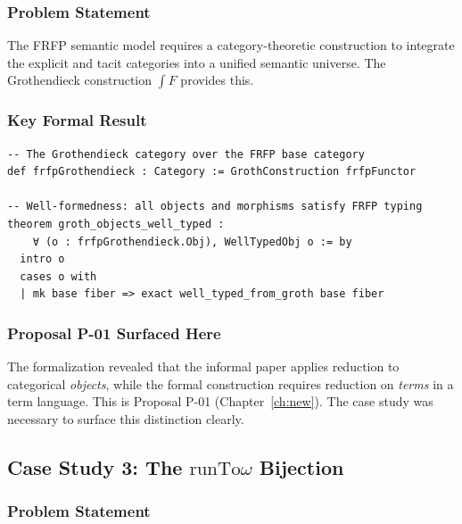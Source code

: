 
\subsubsection*{Problem Statement}

The FRFP semantic model requires a category-theoretic construction to integrate
the explicit and tacit categories into a unified semantic universe. The
Grothendieck construction $\int F$ provides this.

\subsubsection*{Key Formal Result}

\begin{lstlisting}
-- The Grothendieck category over the FRFP base category
def frfpGrothendieck : Category := GrothConstruction frfpFunctor

-- Well-formedness: all objects and morphisms satisfy FRFP typing
theorem groth_objects_well_typed :
    ∀ (o : frfpGrothendieck.Obj), WellTypedObj o := by
  intro o
  cases o with
  | mk base fiber => exact well_typed_from_groth base fiber
\end{lstlisting}

\subsubsection*{Proposal P-01 Surfaced Here}

The formalization revealed that the informal paper applies reduction to
categorical \emph{objects}, while the formal construction requires reduction on
\emph{terms} in a term language. This is Proposal P-01
(Chapter~\ref{ch:new}). The case study was necessary to surface this distinction
clearly.

\subsection{Case Study 3: The \texorpdfstring{$\mathrm{runTo}\omega$}{runToOmega} Bijection}


\subsubsection*{Problem Statement}

